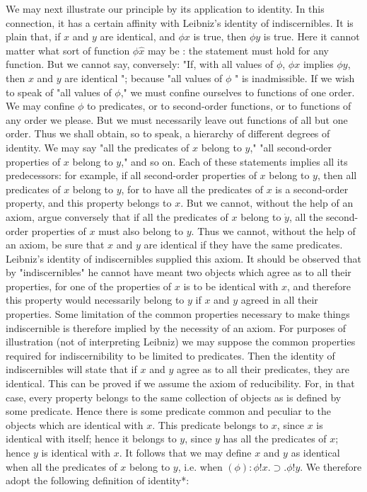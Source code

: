\documentclass[10pt]{article}
\begin{document}
We may next illustrate our principle by its application to identity. In this connection, it has a certain affinity with Leibniz's identity of indiscernibles. It is plain that, if $x$ and $y$ are identical, and $\phi x$ is true, then $\phi y$ is true. Here it cannot matter what sort of function $\phi \hat{x}$ may be : the statement must hold for any function. But we cannot say, conversely: "If, with all values of $\phi$, $\phi x$ implies $\phi y$, then $x$ and $y$ are identical "; because "all values of $\phi$ " is inadmissible. If we wish to speak of "all values of $\phi$," we must confine ourselves to functions of one order. We may confine $\phi$ to predicates, or to second-order functions, or to functions of any order we please. But we must necessarily leave out functions of all but one order. Thus we shall obtain, so to speak, a hierarchy of different degrees of identity. We may say "all the predicates of $x$ belong to $y$," "all second-order properties of $x$ belong to $y$," and so on. Each of these statements implies all its predecessors: for example, if all second-order properties of $x$ belong to $y$, then all predicates of $x$ belong to $y$, for to have all the predicates of $x$ is a second-order property, and this property belongs to $x$. But we cannot, without the help of an axiom, argue conversely that if all the predicates of $x$ belong to $\dot{y}$, all the second-order properties of $x$ must also belong to $y$. Thus we cannot, without the help of an axiom, be sure that $x$ and $y$ are identical if they have the same predicates. Leibniz's identity of indiscernibles supplied this axiom. It should be observed that by "indiscernibles" he cannot have meant two objects which agree as to all their properties, for one of the properties of $x$ is to be identical with $x$, and therefore this property would necessarily belong to $y$ if $x$ and $y$ agreed in all their properties. Some limitation of the common properties necessary to make things indiscernible is therefore implied by the necessity of an axiom. For purposes of illustration (not of interpreting Leibniz) we may suppose the common properties required for indiscernibility to be limited to predicates. Then the identity of indiscernibles will state that if $x$ and $y$ agree as to all their predicates, they are identical. This can be proved if we assume the axiom of reducibility. For, in that case, every property belongs to the same collection of objects as is defined by some predicate. Hence there is some predicate common and peculiar to the objects which are identical with $x$. This predicate belongs to $x$, since $x$ is identical with itself; hence it belongs to $y$, since $y$ has all the predicates of $x$; hence $y$ is identical with $x$. It follows that we may define $x$ and $y$ as identical when all the predicates of $x$ belong to $y$, i.e. when $(\phi): \phi!x . \supset . \phi!y$. We therefore adopt the following definition of identity*:
\end{document}
